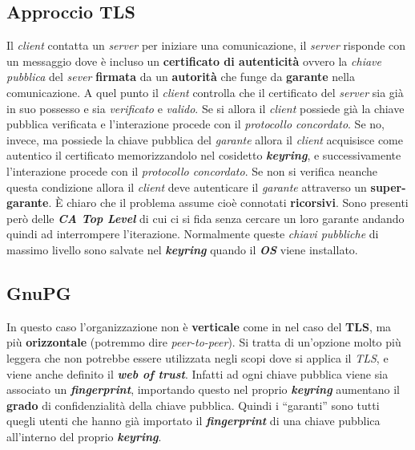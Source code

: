 \subsection{Approccio TLS}
Il \textit{client} contatta un \textit{server} per iniziare una comunicazione, il \textit{server} risponde con un messaggio dove è incluso un \textbf{certificato di autenticità} ovvero la \textit{chiave pubblica} del \textit{sever} \textbf{firmata} da un \textbf{autorità} che funge da \textbf{garante} nella comunicazione. A quel punto il \textit{client} controlla che il certificato del \textit{server} sia già in suo possesso e sia \textit{verificato} e \textit{valido}. Se si allora il \textit{client} possiede già la chiave pubblica verificata e l'interazione procede con il \textit{protocollo concordato}. Se no, invece, ma possiede la chiave pubblica del \textit{garante} allora il \textit{client} acquisisce come autentico il certificato memorizzandolo nel cosidetto \textbf{\textit{keyring}}, e successivamente l'interazione procede con il \textit{protocollo concordato}. Se non si verifica neanche questa condizione allora il \textit{client} deve autenticare il \textit{garante} attraverso un \textbf{super-garante}. È chiaro che il problema assume cioè connotati \textbf{ricorsivi}. Sono presenti però delle \textbf{\textit{CA Top Level}} di cui ci si fida senza cercare un loro garante andando quindi ad interrompere l'iterazione. Normalmente queste \textit{chiavi pubbliche} di massimo livello sono salvate nel \textbf{\textit{keyring}} quando il \textbf{\textit{OS}} viene installato.

\subsection{GnuPG}
In questo caso l'organizzazione non è \textbf{verticale} come in nel caso del \textbf{TLS}, ma più \textbf{orizzontale} (potremmo dire \textit{peer-to-peer}). Si tratta di un'opzione molto più leggera che non potrebbe essere utilizzata negli scopi dove si applica il \textit{TLS}, e viene anche definito il \textbf{\textit{web of trust}}. Infatti ad ogni chiave pubblica viene sia associato un \textbf{\textit{fingerprint}}, importando questo nel proprio \textbf{\textit{keyring}} aumentano il \textbf{grado} di confidenzialità della chiave pubblica. Quindi i ``garanti'' sono tutti quegli utenti che hanno già importato il \textbf{\textit{fingerprint}} di una chiave pubblica all'interno del proprio \textbf{\textit{keyring}}.